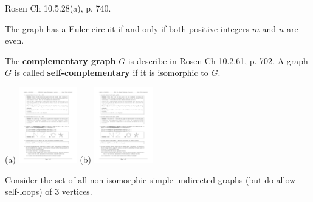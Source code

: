 \begin{questions}
\bonusquestion[1] Rosen Ch 10.5.28(a), p. 740.
    \ifprintanswers
        \vspace{-10pt}
    \fi
    \begin{solution}
        The graph has a Euler circuit if and only if both positive integers $m$ and $n$ are even.
    \end{solution}



\bonusquestion[3] The \textbf{complementary graph} $G$ is describe in Rosen Ch 10.2.61, p. 702. A graph $G$ is called \textbf{self-complementary} if it is isomorphic to $G$.
    \ifprintanswers
        \vspace{-10pt}
    \fi
    \begin{solution}
        (a) \includegraphics[width=1in]{figs/hw12-bp1a.pdf} \hspace{0.25in} (b) \includegraphics[width=1in]{figs/hw12-bp1b.pdf}
    \end{solution}




\bonusquestion[10]  Consider the set of all non-isomorphic simple undirected graphs (but do allow self-loops) of 3 vertices.  %


\end{questions}
